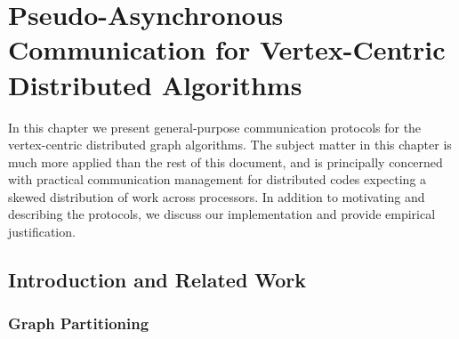 \documentclass[10]{report}
\begin{document}
\chapter{Pseudo-Asynchronous Communication for Vertex-Centric Distributed Algorithms}
 \label{chap:async}

In this chapter we present general-purpose communication protocols for the vertex-centric distributed graph algorithms. 
The subject matter in this chapter is much more applied than the rest of this document, and is principally concerned with practical communication management for distributed codes expecting a skewed distribution of work across processors.
In addition to motivating and describing the protocols, we discuss our implementation and provide empirical justification.


\section{Introduction and Related Work} \label{async:sec:intro}


\subsection{Graph Partitioning} \label{async:sec:intro:partitioning}
\end{document}
